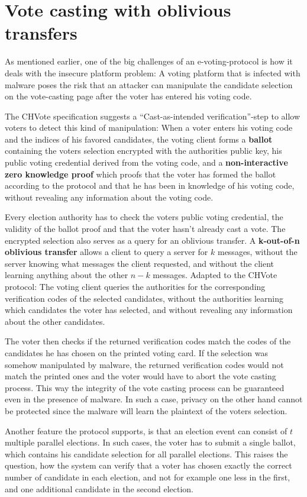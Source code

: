 \section{Vote casting with oblivious transfers}
As mentioned earlier, one of the big challenges of an e-voting-protocol is how it deals with the insecure platform problem: A voting platform that is infected with malware poses the risk that an attacker can manipulate the candidate selection on the vote-casting page after the voter has entered his voting code.

The CHVote specification suggests a "`Cast-as-intended verification"'-step to allow voters to detect this kind of manipulation: When a voter enters his voting code and the indices of his favored candidates, the voting client forms a \textbf{ballot} containing the voters selection encrypted with the authorities public key, his public voting credential derived from the voting code, and a \textbf{non-interactive zero knowledge proof} which proofs that the voter has formed the ballot according to the protocol and that he has been in knowledge of his voting code, without revealing any information about the voting code.

Every election authority has to check the voters public voting credential, the validity of the ballot proof and that the voter hasn't already cast a vote. The encrypted selection also serves as a query for an oblivious transfer. A \textbf{k-out-of-n oblivious transfer} allows a client to query a server for $k$ messages, without the server knowing what messages the client requested, and without the client learning anything about the other $n-k$ messages. Adapted to the CHVote protocol: The voting client queries the authorities for the corresponding verification codes of the selected candidates, without the authorities learning which candidates the voter has selected, and without revealing any information about the other candidates.

The voter then checks if the returned verification codes match the codes of the candidates he has chosen on the printed voting card. If the selection was somehow manipulated by malware, the returned verification codes would not match the printed ones and the voter would have to abort the vote casting process. This way the integrity of the vote casting process can be guaranteed even in the presence of malware. In such a case, privacy on the other hand cannot be protected since the malware will learn the plaintext of the voters selection.

Another feature the protocol supports, is that an election event can consist of $t$ multiple parallel elections. In such cases, the voter has to submit a single ballot, which contains his candidate selection for all parallel elections. This raises the question, how the system can verify that a voter has chosen exactly the correct number of candidate in each election, and not for example one less in the first, and one additional candidate in the second election.

